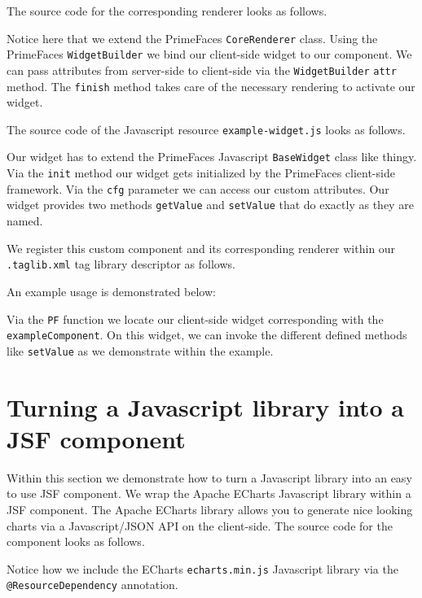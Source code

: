 The source code for the corresponding renderer looks as follows.

Notice here that we extend the PrimeFaces \texttt{CoreRenderer} class.
Using the PrimeFaces \texttt{WidgetBuilder} we bind our client-side widget to our component.
We can pass attributes from server-side to client-side via the \texttt{WidgetBuilder} \texttt{attr} method.
The \texttt{finish} method takes care of the necessary rendering to activate our widget.

The source code of the Javascript resource \texttt{example-widget.js} looks as follows.

Our widget has to extend the PrimeFaces Javascript \texttt{BaseWidget} class like thingy.
Via the \texttt{init} method our widget gets initialized by the PrimeFaces client-side framework.
Via the \texttt{cfg} parameter we can access our custom attributes.
Our widget provides two methods \texttt{getValue} and \texttt{setValue} that do exactly as they are named.

We register this custom component and its corresponding renderer within our \texttt{.taglib.xml} tag library descriptor as follows.


An example usage is demonstrated below:

Via the \texttt{PF} function we locate our client-side widget corresponding with the \texttt{exampleComponent}.
On this widget, we can invoke the different defined methods like \texttt{setValue} as we demonstrate within the example.

\section{Turning a Javascript library into a JSF component}
Within this section we demonstrate how to turn a Javascript library into an easy to use JSF component.
We wrap the Apache ECharts \cite{ECharts} Javascript library within a JSF component.
The Apache ECharts library allows you to generate nice looking charts via a Javascript/JSON API on the client-side.
The source code for the component looks as follows.

Notice how we include the ECharts \texttt{echarts.min.js} Javascript library via the \texttt{@ResourceDependency} annotation.

